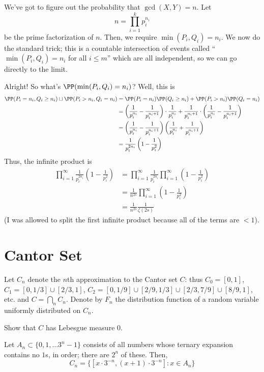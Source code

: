 \documentclass[11pt, headheight=30pt]{scrartcl}
\begin{document}
We've got to figure out the probability that $\gcd(X, Y) = n$.
Let
\[
    n = \prod_{i=1}^k p_i^{n_i}    
\]
be the prime factorization of $n$. Then, we require $\min(P_i, Q_i) = n_i$.
We now do the standard trick; this is a countable intersection
of events called ``$\min(P_i, Q_i) = n_i$ for all $i\leq m$'' which
are all independent, so we can go directly to the limit.

Alright! So what's $\PP(\min(P_i, Q_i) = n_i)$? Well, this is
\begin{align*}
    \PP(P_i = n_i, Q_i\geq n_i) \sqcup \PP(P_i > n_i, Q_i = n_i) &= \PP(P_i = n_i)\PP(Q_i \geq n_i) + \PP(P_i > n_i)\PP(Q_i = n_i)\\
    &= \left(\frac{1}{p_i^{n_i}} - \frac{1}{p_i^{n_i + 1}}\right)\cdot \frac{1}{p_i^{n_i}} + \frac{1}{p_i^{n_i + 1}}\cdot \left(\frac{1}{p_i^{n_i}} - \frac{1}{p_i^{n_i + 1}}\right)\\
    &= \left(\frac{1}{p_i^{n_i}} - \frac{1}{p_i^{n_i + 1}}\right)\left(\frac{1}{p_i^{n_i}} + \frac{1}{p_i^{n_i + 1}}\right)\\
    &= \frac{1}{p_i^{2n_i}}\left(1 - \frac{1}{p_i^{2}}\right)
\end{align*}
Thus, the infinite product is
\begin{align*}
    \prod_{i=1}^\infty \frac{1}{p_i^{2n_i}}\left(1 - \frac{1}{p_i^{2}}\right) &= \prod_{i=1}^\infty \frac{1}{p_i^{2n_i}}\prod_{i=1}^\infty \left(1 - \frac{1}{p_i^{2}}\right)\\
    &= \frac{1}{n^{2s}}\prod_{i=1}^\infty \left(1 - \frac{1}{p_i^{2}}\right)\\
    &= \frac{1}{n^{2s}}\frac{1}{\zeta(2s)}
\end{align*}
(I was allowed to split the first infinite product because all of the terms are $<1$).

\section{Cantor Set}
\begin{prob}
    Let $C_n$ denote the $n$th approximation to the Cantor set $C$:
    thus $C_0 = [0, 1]$,
    $C_1 = [0, 1/3] \cup [2/3, 1]$,
    $C_2 = [0, 1/9] \cup [2/9, 1/3] \cup [2/3, 7/9] \cup [8/9, 1]$,
    etc. and $C = \bigcap_n C_n$.
    Denote by $F_n$ the distribution function of a random variable uniformly distributed on $C_n$.
    
    Show that $C$ has Lebesgue measure $0$.
\end{prob}
Let $A_n\subset \{0,1,\dots 3^n-1\}$ consists of all numbers whose ternary
expansion contains no $1$s, in order; there are $2^n$ of these.
Then,
\[
    C_n = \{[x\cdot 3^{-n}, (x + 1)\cdot 3^{-n}] : x\in A_n\}    
\]
\end{document}
